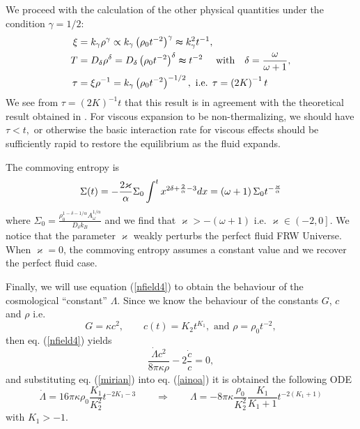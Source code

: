 \documentclass{revtex4}
\begin{document}
We proceed with the calculation of the other physical quantities under the
condition $\gamma =1/2$:
\begin{align}
\xi & =k_{\gamma }\rho ^{\gamma }\propto k_{\gamma }\left( \rho
_{0}t^{-2}\right) ^{\gamma }\thickapprox k_{\gamma }^{2}t^{-1}, \\
T& =D_{\delta }\rho ^{\delta }=D_{\delta }\left( \rho _{0}t^{-2}\right)
^{\delta }\thickapprox t^{-2}\text{ \ \ \ with \ \ }\delta =\frac{\omega }{%
\omega +1}, \\
\tau & =\xi \rho ^{-1}=k_{\gamma }\left( \rho _{0}t^{-2}\right) ^{-1/2},%
\text{ i.e. }\tau =\left( 2K\right) ^{-1}t
\end{align}
We see from $\tau =\left( 2K\right) ^{-1}t$ that this result is in agreement
with the theoretical result obtained in \cite{Ma95}. For viscous expansion
to be non-thermalizing, we should have $\tau <t,$ or otherwise the basic
interaction rate for viscous effects should be sufficiently rapid to restore
the equilibrium as the fluid expands.

The commoving entropy is
\begin{equation}
\Sigma (t)=-\frac{2\varkappa }{\alpha }\Sigma _{0}\int^{t}x^{2\delta +\frac{2%
}{\alpha }-3}dx=\left( \omega +1\right) \Sigma _{0}t^{-\frac{\varkappa }{%
\alpha }}
\end{equation}
where $\Sigma _{0}=\frac{\rho _{0}^{1-\delta -1/\alpha }A_{\omega
}^{1/\alpha }}{D_{\delta }k_{B}}$ and we find that $\varkappa >-\left(
\omega +1\right) $ i.e. $\varkappa \in \left( -2,0\right] .$ We notice that
the parameter $\varkappa $ weakly perturbs the perfect fluid FRW Universe.
When $\varkappa =0$, the commoving entropy assumes a constant value and we
recover the perfect fluid case.

Finally, we will use equation (\ref{nfield4}) to obtain the behaviour of the
cosmological ``constant'' $\Lambda .$ Since we know the behaviour of the
constants $G$, $c$ and $\rho $ i.e.
\begin{equation}
G=\kappa c^{2},\qquad c(t)=K_{2}t^{K_{1}},\text{ \ \ \ and \ \ \ \ }\rho
=\rho _{0}t^{-2},  \label{mirian}
\end{equation}
then eq. (\ref{nfield4}) yields
\begin{equation}
\frac{\dot{\Lambda}c^{2}}{8\pi \kappa \rho }-2\frac{\dot{c}}{c}=0,
\label{ainoa}
\end{equation}
and substituting eq. (\ref{mirian}) into eq. (\ref{ainoa}) it is obtained
the following ODE
\begin{equation}
\dot{\Lambda}=16\pi \kappa \rho _{0}\frac{K_{1}}{K_{2}^{2}}%
t^{-2K_{1}-3}\qquad \Longrightarrow \qquad \Lambda =-8\pi \kappa \frac{\rho
_{0}}{K_{2}^{2}}\frac{K_{1}}{K_{1}+1}t^{-2\left( K_{1}+1\right) }
\label{cova}
\end{equation}
with $K_{1}>-1.$
\end{document}
